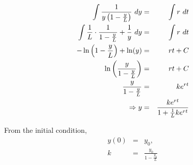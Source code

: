   \begin{frame}

  \begin{eqnarray*}
      \int \frac{1}{y \left( 1 - \frac{y}{L} \right)} ~ dy & = & \int r ~ dt \\
      \int \frac{1}{L} \cdot \frac{1}{1 - \frac{y}{L}} + \frac{1}{y} ~ dy & = & \int r ~ dt \\
      -\ln\left( 1 - \frac{y}{L}\right) + \ln(y) & = & rt + C \\
      \ln\left(\frac{y}{1 - \frac{y}{L}}\right) & = & rt + C \\
      \frac{y}{1 - \frac{y}{L}} & = & k e^{rt} \\
      \Rightarrow y & = & \frac{k e^{rt}}{1 + \frac{1}{L} k e^{rt}}  
  \end{eqnarray*}


  From the initial condition,
  \begin{eqnarray*}
    y(0) & = & y_0, \\
    k & = & \frac{y_0}{1 - \frac{y_0}{L}}
  \end{eqnarray*}
  

\end{frame}



